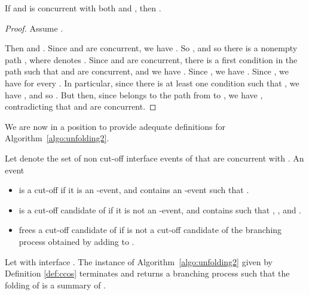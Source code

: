 \documentclass{llncs}
\begin{document}
\begin{lemma}
\label{lem:conc}
If  and  is concurrent with both  and , then 
.
\end{lemma}

\begin{proof}
Assume . 

Then  and . Since  and  are concurrent,
we have . So , and so
there is a nonempty path ,
where  denotes . Since  and  are concurrent, there is 
a first condition  in the path such that  and  are concurrent, and we have
. Since , we have . Since
, we have  for every . In
particular, since there is at least one condition  such that ,
we have , and so . But then, since  belongs to the path 
from  to , we have , contradicting that 
 and  are concurrent.
\end{proof}

We are now in a position to provide adequate definitions
for Algorithm~\ref{algo:unfolding2}.

\begin{definition} 
\label{def:ccos}
Let  denote the set of 
non cut-off interface events of  that are concurrent with . An event   
\begin{itemize}
\item is a cut-off if it is an -event, and  contains an -event  
such that .
\item is a cut-off candidate of  if it is not an -event, and  contains  such that
, , and . 
\item frees a cut-off candidate  of  if  is not a cut-off candidate of the branching process
obtained by adding  to . 
\end{itemize}
\end{definition}


\begin{theorem}
\label{thm:correctnessacceptable}
Let  with interface . The instance of Algorithm~\ref{algo:unfolding2} given by Definition \ref{def:ccos} terminates and returns a branching process  such that the folding 
of  is a summary of .
\end{theorem}
\end{document}
